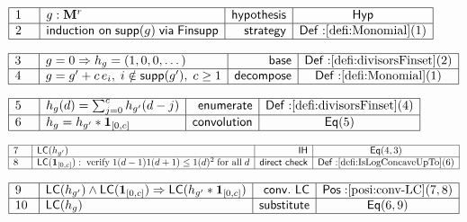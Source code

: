 \documentclass[11pt,reqno]{amsart}
\begin{document}
\noindent $%
\begin{array}{|m{0.5cm}|l|r|c|}
\hline
1 & g:\mathbf{M}^{r} & \mathsf{hypothesis} & \mathsf{Hyp} \\ \hline
2 & \mathsf{induction\ on}\;\mathsf{supp}(g)\;\mathsf{via}\;\mathsf{Finsupp}
& \mathsf{strategy} & \mathsf{Def:}\ref{defi:Monomial}(1) \\ \hline
\end{array}%
$

\nointerlineskip\noindent$%
\begin{array}{|m{0.5cm}|l|r|c|}
\hline
3 & g=0\Rightarrow h_{g}=(1,0,0,\dots) & \mathsf{base} & \mathsf{Def:}\ref%
{defi:divisorsFinset}(2) \\ \hline
4 & g=g^{\prime}+c\,e_{i},\;i\notin\mathsf{supp}(g^{\prime}),\;c\ge1 & 
\mathsf{decompose} & \mathsf{Def:}\ref{defi:Monomial}(1) \\ \hline
\end{array}%
$

\nointerlineskip\noindent$%
\begin{array}{|m{0.5cm}|l|r|c|}
\hline
5 & h_{g}(d)=\sum_{j=0}^{c}h_{g^{\prime}}(d-j) & \mathsf{enumerate} & 
\mathsf{Def:}\ref{defi:divisorsFinset}(4) \\ \hline
6 & h_{g}=h_{g^{\prime}}*\mathbf{1}_{[0,c]} & \mathsf{convolution} & \mathsf{%
Eq}(5) \\ \hline
\end{array}%
$

\nointerlineskip\noindent$%
\begin{array}{|m{0.5cm}|l|r|c|}
\hline
7 & \mathsf{LC}(h_{g^{\prime}}) & \mathsf{IH} & \mathsf{Eq}(4,3) \\ \hline
8 & \mathsf{LC}(\mathbf{1}_{[0,c]}):\;\text{verify}\;1(d-1)1(d+1)\le
1(d)^{2}\;\text{for all}\;d & \mathsf{direct\ check} & \mathsf{Def:}\ref%
{defi:IsLogConcaveUpTo}(6) \\ \hline
\end{array}%
$

\nointerlineskip\noindent$%
\begin{array}{|m{0.5cm}|l|r|c|}
\hline
9 & \mathsf{LC}(h_{g^{\prime}})\wedge\mathsf{LC}(\mathbf{1}%
_{[0,c]})\Rightarrow\mathsf{LC}(h_{g^{\prime}}*\mathbf{1}_{[0,c]}) & \mathsf{%
conv.\ LC} & \mathsf{Pos:}\ref{posi:conv-LC}(7,8) \\ \hline
10 & \mathsf{LC}(h_{g}) & \mathsf{substitute} & \mathsf{Eq}(6,9) \\ \hline
\end{array}%
$
\end{document}

